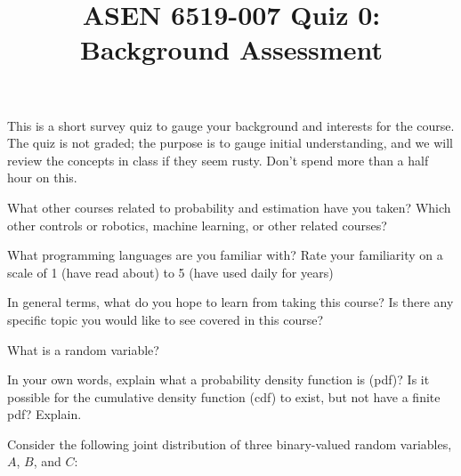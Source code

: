\documentclass{exam}
\title{ASEN 6519-007 Quiz 0: Background Assessment}
\newcommand{\answer}[0]{\vspace{30pt}}
\begin{document}
\maketitle

    This is a short survey quiz to gauge your background and interests for the course. The quiz is not graded; the purpose is to gauge initial understanding, and we will review the concepts in class if they seem rusty. Don't spend more than a half hour on this. 

\begin{questions}
    \question What other courses related to probability and estimation have you taken? Which other controls or robotics, machine learning, or other related courses? 

    \answer

    \question What programming languages are you familiar with? Rate your familiarity on a scale of 1 (have read about) to 5 (have used daily for years)

    \answer

    \question In general terms, what do you hope to learn from taking this course? Is there any specific topic you would like to see covered in this course?

    \answer

    \question What is a random variable?

    \answer

    \question In your own words, explain what a probability density function is (pdf)? Is it possible for the cumulative density function (cdf) to exist, but not have a finite pdf? Explain.

    \answer

    \question Consider the following joint distribution of three binary-valued random variables, $A$, $B$, and $C$:


\end{questions}
\end{document}
